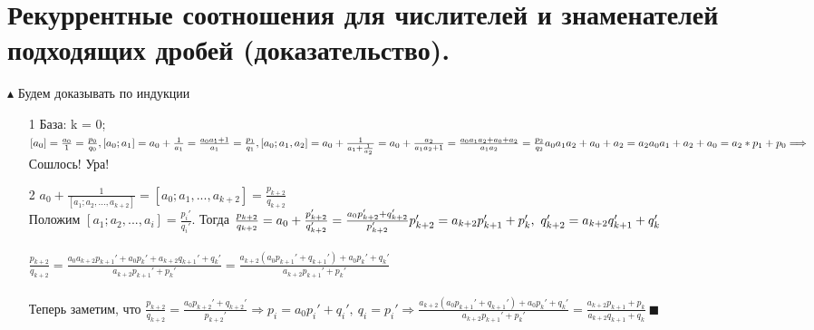 \section{Рекуррентные соотношения для числителей и знаменателей подходящих дробей (доказательство).}
$\blacktriangle$  Будем доказывать по индукции
\begin{itemize}
    \item[1] База: k = 0; $[a_0] = \frac{a_0}{1} = \frac{p_0}{q_0}, [a_0; a_1] = a_0 + \frac{1}{a_1} = \frac{a_0 a_1 + 1}{a_1} = \frac{p_1}{q_1}, [a_0; a_1, a_2] = a_0 + \frac{1}{a_1 + \frac{1}{a_2}} = a_0 + \frac{a_2}{a_1a_2 + 1} = \frac{a_0a_1a_2 + a_0 + a_2}{a_1 a_2} = \frac{p_2}{q_2}\\ \\ a_0a_1a_2 + a_0 + a_2 = a_2a_0a_1 + a_2 + a_0 = a_2 * p_1 + p_0 \Longrightarrow$ Сошлось! Ура!
    \item[2] $a_0 + \frac{1}{[a_1; a_2,..., a_{k+2}]} = [a_0; a_1,..., a_{k+2}] = \frac{p_{k+2}}{q_{k+2}}$\\ Положим $[a_1; a_2, ..., a_i] = \frac{p_{i}'}{q_i'}$. Тогда $\frac{p_{k+2}}{q_{k+2}} = a_0 +  \frac{p_{k+2}'}{q_{k+2}'} = \frac{a_0p_{k+2}' + q_{k+2}'}{p_{k+2}'} \\ \\ p_{k+2}' = a_{k+2}p_{k+1}' + p_k', \ q_{k+2}' = a_{k+2}q_{k+1}' + q_k'$
    \\
    \\
    $\frac{p_{k+2}}{q_{k+2}} = \frac{a_0 a_{k+2} p_{k+1}' + a_0 p_k' + a_{k+2}q_{k+1}' + q_k'}{a_{k+2}p_{k+1}' + p_k'} = \frac{a_{k+2}(a_0 p_{k+1}' + q_{k+1}') + a_0 p_k' + q_k'}{a_{k+2}p_{k+1}' + p_k'}$ \\ \\ Теперь заметим, что $\frac{p_{k+2}}{q_{k+2}} = \frac{a_0p_{k+2}' + q_{k+2}'}{p_{k+2}'} \Longrightarrow p_i = a_0 p_i' + q_i', \ q_i = p_i' \Longrightarrow  \frac{a_{k+2}(a_0 p_{k+1}' + q_{k+1}') + a_0 p_k' + q_k'}{a_{k+2}p_{k+1}' + p_k'} = \frac{a_{k+2} p_{k+1} + p_{k}}{a_{k+2}q_{k+1} + q_k} \ \blacksquare$
\end{itemize} 


